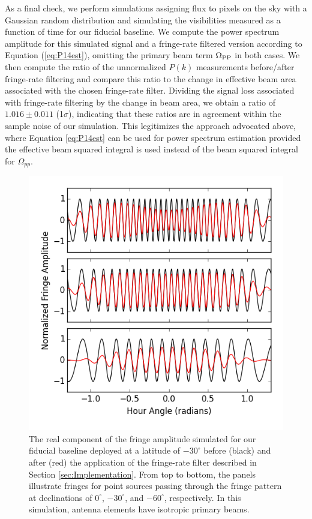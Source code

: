 \documentclass[twocolumn,apj,numberedappendix]{emulateapj}
\begin{document}
As a final check, we perform simulations assigning flux to pixels on the sky with a Gaussian random distribution
and simulating the visibilities measured as a function of time for our fiducial baseline.  We compute the
power spectrum amplitude for this simulated signal and a fringe-rate filtered version according to
Equation (\ref{eq:P14est}), omitting the primary beam term $\Omega_{\rm PP}$ in both cases.  We then compute
the ratio of the unnormalized $P(k)$ measurements before/after fringe-rate filtering and compare 
this ratio to the change in effective
beam area associated with the chosen fringe-rate filter.  Dividing the signal loss associated with
fringe-rate filtering by the change in beam area, we obtain a ratio of $1.016\pm0.011$ (1$\sigma$), 
indicating that these ratios are in agreement 
within the sample noise of our simulation. This legitimizes the approach advocated above, where
Equation \eqref{eq:P14est} can be used for power spectrum estimation provided the effective beam
squared integral is used instead of the beam squared integral for $\Omega_{pp}$.


\begin{figure}\centering
\includegraphics[width=0.9\columnwidth]{plots/src_track_flat.png}
\caption{
The real component of the fringe amplitude simulated for our fiducial 
baseline deployed at a latitude of $-30^\circ$
before (black) and after (red) the application
of the fringe-rate filter described in Section \ref{sec:Implementation}.  From top to bottom,
the panels illustrate fringes
for point sources 
passing through the fringe pattern at declinations of $0^\circ$,
$-30^\circ$, and $-60^\circ$, respectively.  In this simulation,
antenna elements have isotropic primary beams.
}\label{fig:src_track_flat}
\end{figure}
\end{document}

